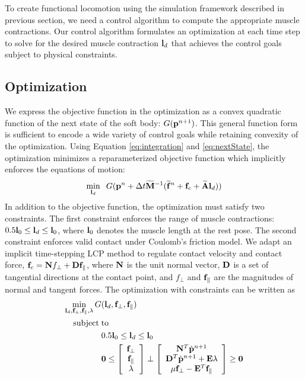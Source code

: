 To create functional locomotion using the simulation framework described
in previous section, we need a control algorithm to compute the appropriate
muscle contractions. Our control algorithm formulates an optimization at
each time step to solve for the desired muscle contraction $\mathbf{l}_d$ that
achieves the control goals subject to physical constraints.

\subsection{Optimization}
We express the objective function in the optimization as a convex
quadratic function of the next state of the soft body: $G(\mathbf{p}^{n+1})$.
This general function form is sufficient to encode a wide variety of
control goals while retaining convexity of the optimization. Using
Equation \ref{eq:integration} and \ref{eq:nextState}, the optimization
minimizes a reparameterized objective function which implicitly enforces
the equations of motion:
\begin{equation}
\min_{\mathbf{l}_d} \;\;G(\mathbf{p}^{n}+\Delta t \mathbf{\widetilde{M}}^{-1}(\mathbf{\widetilde{f}}^n +\mathbf{f}_c + \mathbf{\widetilde{A}} \mathbf{l}_d))
\label{eq:objectiveFunction}
\end{equation}
In addition to the objective function, the optimization must satisfy two
constraints. The first constraint enforces the range of muscle
contractions: $0.5 \mathbf{l}_0 \leq \mathbf{l}_d \leq \mathbf{l}_0$, where $\mathbf{l}_0$ denotes the muscle length at the rest pose. The second constraint enforces valid contact under Coulomb's friction model. We adapt an implicit time-stepping LCP method to regulate contact velocity and contact force, $\mathbf{f}_c = \mathbf{N} f_\perp + \mathbf{D}\mathbf{f}_\parallel$, where $\mathbf{N}$ is the unit normal vector, $\mathbf{D}$ is a set of tangential directions at the contact point, and $f_\perp$ and $\mathbf{f}_\parallel$ are the magnitudes of normal and tangent forces. The optimization with constraints can be written as
\begin{align}
\label{eqn:optimization}
 \min_{\mathbf{l}_d,\mathbf{f}_\perp,\mathbf{f}_\parallel,\lambda} G&(\mathbf{l}_d,\mathbf{f}_\perp,\mathbf{f}_\parallel)  \\
\nonumber  \mathrm{subject\;} &\mathrm{to} \\
\nonumber   &0.5\mathbf{l}_0 \leq \mathbf{l}_d \leq \mathbf{l}_0 \\
\nonumber  &\mathbf{0} \leq \left[ \begin{array}{c} \mathbf{f}_\perp \\ \mathbf{f}_\parallel \\ \lambda \end{array} \right] \perp
 \left[ \begin{array}{c} \mathbf{N}^T\dot{\mathbf{p}}^{n+1} \\ \mathbf{D}^T \dot{\mathbf{p}}^{n+1} + \mathbf{E} \lambda \\ \mu \mathbf{f}_\perp - \mathbf{E}^T \mathbf{f}_\parallel \end{array} \right] \geq \mathbf{0}
\end{align}
